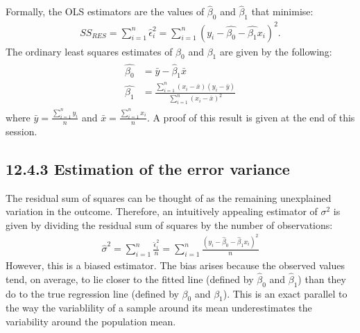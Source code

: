 \documentclass[letterpaper,10pt,english]{jupyterBook}
\begin{document}
\sphinxAtStartPar
Formally, the OLS estimators are the values of \(\hat{\beta}_0\) and \(\hat{\beta}_1\) that minimise:
\begin{equation*}
\begin{split}
SS_{RES} = \sum_{i=1}^n \hat{\epsilon}_i^2 = \sum_{i=1}^n (y_i - \hat{\beta_0} -\hat{\beta_1}x_i)^2.
\end{split}
\end{equation*}
\sphinxAtStartPar
The ordinary least squares estimates of \(\beta_0\) and \(\beta_1\) are given by the following:
\begin{equation*}
\begin{split}
\begin{align}
\hat{\beta_0} &= \bar{y} - \hat{\beta}_1 \bar{x} \\
\hat{\beta_1} &= \frac{\sum_{i=1}^n (x_i-\bar{x})(y_i-\bar{y})}{\sum_{i=1}^n (x_i-\bar{x})^2}
\end{align}
\end{split}
\end{equation*}
\sphinxAtStartPar
where \(\bar{y}=\frac{\sum_{i=1}^n y_i}{n}\) and \(\bar{x} = \frac{\sum_{i=1}^n x_i}{n}\). A proof of this result is given at the end of this session.


\subsection{12.4.3 Estimation of the error variance}
\label{\detokenize{12.e. Linear Regression I:estimation-of-the-error-variance}}
\sphinxAtStartPar
The residual sum of squares can be thought of as the remaining unexplained variation in the outcome. Therefore, an intuitively appealing estimator of \(\sigma^2\) is given by dividing the residual sum of squares by the number of observations:
\begin{equation*}
\begin{split}
\hat{\sigma}^2 = \sum_{i=1}^n \frac{\hat{\epsilon}_i^2}{n} = \sum_{i=1}^n \frac{(y_i-\hat{\beta}_0-\hat{\beta}_1 x_i)^2}{n}
\end{split}
\end{equation*}
\sphinxAtStartPar
However, this is a biased estimator. The bias arises because the observed values tend, on average, to lie closer to the fitted line (defined by \(\hat{\beta}_0\) and \(\hat{\beta}_1\)) than they do to the true regression line (defined by \(\beta_0\) and \(\beta_1\)). This is an exact parallel to the way the variablility of a sample around its mean underestimates the variability around the population mean.
\end{document}
